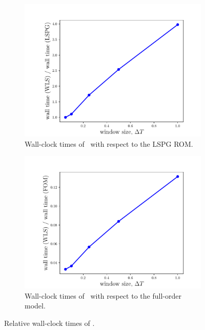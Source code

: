 \begin{figure}
\begin{center}
\begin{subfigure}[t]{0.45\textwidth}
\includegraphics[trim={0cm 0cm 0cm 0cm},clip,width=1.0\linewidth]{figs/cavity_new/walltime_vs_windowSize.pdf}
\caption{Wall-clock times of \methodAcronymROMs\ with respect to the LSPG ROM.}
\label{fig:cav_wallclock_lspg}
\end{subfigure}
\begin{subfigure}[t]{0.45\textwidth}
\includegraphics[trim={0cm 0cm 0cm 0cm},clip,width=1.0\linewidth]{figs/cavity_new/rel_walltime_vs_windowSize.pdf}
\caption{Wall-clock times of \methodAcronymROMs\ with respect to the full-order model.}
\label{fig:cav_wallclock_fom}
\end{subfigure}
\caption{Relative wall-clock times of \methodAcronymROMs.}
\label{fig:cav_wallclock}
\end{center}
\end{figure}



